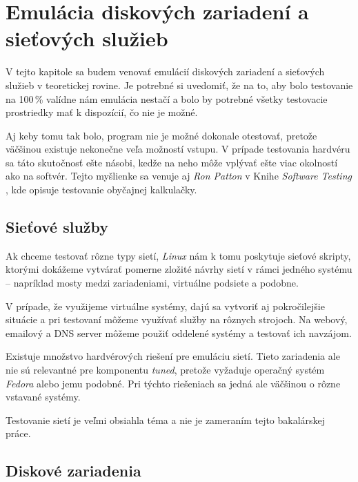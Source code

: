 %
%

\chapter{Emulácia diskových zariadení a sieťových služieb}

V tejto kapitole sa budem venovať emulácií diskových zariadení a sieťových
služieb v teoretickej rovine. Je potrebné si uvedomiť, že na to, aby bolo
testovanie na 100\,\% valídne nám emulácia nestačí a bolo by potrebné všetky
testovacie prostriedky mať k dispozícií, čo nie je možné.

Aj keby tomu tak bolo, program nie je možné dokonale otestovať, pretože
väčšinou existuje nekonečne veľa možností vstupu. V prípade testovania hardvéru
sa táto skutočnosť ešte násobi, kedže na neho môže vplývať ešte viac okolností
ako na softvér. Tejto myšlienke sa venuje aj \emph{Ron Patton} v Knihe
\emph{Software Testing} \cite{Software_testing_patton}, kde opisuje testovanie
obyčajnej kalkulačky.

\section{Sieťové služby}

Ak chceme testovať rôzne typy sietí, \emph{Linux} nám k tomu poskytuje sieťové
skripty, ktorými dokážeme vytvárať pomerne zložité návrhy sietí v rámci jedného
systému -- napríklad mosty medzi zariadeniami, virtuálne podsiete a podobne.

V prípade, že využijeme virtuálne systémy, dajú sa vytvoriť aj pokročilejšie
situácie a pri testovaní môžeme využívať služby na rôznych strojoch. Na webový,
emailový a DNS server môžeme použiť oddelené systémy a testovať ich navzájom.

Existuje množstvo hardvérových riešení pre emuláciu sietí. Tieto zariadenia ale
nie sú relevantné pre komponentu \emph{tuned}, pretože vyžaduje operačný systém
\emph{Fedora} alebo jemu podobné. Pri týchto riešeniach sa jedná ale väčšinou o
rôzne vstavané systémy.

Testovanie sietí je veľmi obsiahla téma a nie je zameraním tejto bakalárskej
práce.

%
%

\section{Diskové zariadenia}


